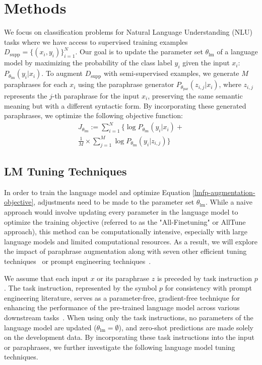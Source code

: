 \documentclass[11pt]{article}
\begin{document}
\section{Methods}
We focus on classification problems for Natural Language Understanding (NLU) tasks where we have access to supervised training examples $D_{\text{supp}} = \{(x_i, y_i)\}_{i=1}^{N}$. Our goal is to update the parameter set $\theta_{\text{lm}}$ of a language model by maximizing the probability of the class label $y_i$ given the input $x_i$: $P_{\theta_{\text{lm}}} (y_i | x_i)$. To augment $D_{\text{supp}}$ with semi-supervised examples, we generate $M$ paraphrases for each $x_i$ using the paraphrase generator $P_{\theta_{\text{par}}} (z_{i,j} | x_i)$, where $z_{i,j}$ represents the $j$-th paraphrase for the input $x_i$, preserving the same semantic meaning but with a different syntactic form. By incorporating these generated paraphrases, we optimize the following objective function:
\begin{multline}
J_{\theta_{\text{lm}}} := \sum_{i=1}^{N} \{\log P_{\theta_{\text{lm}}} (y_i | x_i) + \\
\frac{1}{M} \times \sum_{j=1}^{M} \log P_{\theta_{\text{lm}}} (y_i | z_{i,j})\}
\label{lmfp-augmentation-objective}
\end{multline}
\subsection{LM Tuning Techniques}
In order to train the language model and optimize Equation \ref{lmfp-augmentation-objective}, adjustments need to be made to the parameter set $\theta_{\text{lm}}$. While a naive approach would involve updating every parameter in the language model to optimize the training objective (referred to as the "All-Finetuning" or AllTune approach), this method can be computationally intensive, especially with large language models and limited computational resources. As a result, we will explore the impact of paraphrase augmentation along with seven other efficient tuning techniques~\cite{pmlr-v97-houlsby19a} or prompt engineering techniques~\cite{liu2021pretrain}.

We assume that each input $x$ or its paraphrase $z$ is preceded by task instruction $p$. The task instruction, represented by the symbol $p$ for consistency with prompt engineering literature, serves as a parameter-free, gradient-free technique for enhancing the performance of the pre-trained language model across various downstream tasks~\cite{DBLP:journals/corr/abs-2005-14165, petroni-etal-2019-language, deng-etal-2022-rlprompt}. When using only the task instructions, no parameters of the language model are updated ($\theta_{\text{lm}}=\emptyset$), and zero-shot predictions are made solely on the development data. By incorporating these task instructions into the input or paraphrases, we further investigate the following language model tuning techniques.
\end{document}
